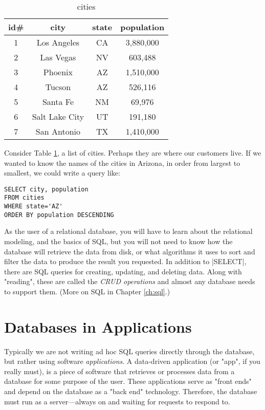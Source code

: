 \documentclass[11pt]{book}
\newcommand{\term}[1]{\emph{#1}} %
\newcommand{\head}[1]{\textnormal{\textbf{#1}}} %
\begin{document}
\begin{table}
\centering
\caption{cities}\label{tab:cities}
\vspace{10pt}
\begin{tabular}{cccc}
    \toprule[1.5pt]
    \head{id\#} & \head{city} & \head{state} & \head{population}\\
    \midrule
    1 & Los Angeles & CA & 3,880,000\\
    2 & Las Vegas & NV & 603,488\\
    3 & Phoenix & AZ & 1,510,000\\
    4 & Tucson & AZ & 526,116\\
    5 & Santa Fe & NM & 69,976\\
    6 & Salt Lake City & UT & 191,180\\
    7 & San Antonio & TX & 1,410,000\\
    \bottomrule[1.5pt]
\end{tabular}
\end{table}

Consider Table \ref{tab:cities}, a list of cities.  Perhaps they are where our customers live.  If we wanted to know the names of the cities in Arizona, in order from largest to smallest, we could write a query like:

\begin{verbatim}
SELECT city, population
FROM cities
WHERE state='AZ'
ORDER BY population DESCENDING
\end{verbatim}

As the user of a relational database, you will have to learn about the relational modeling, and the basics of SQL, but you will not need to know how the database will retrieve the data from disk, or what algorithms it uses to sort and filter the data to produce the result you requested.  In addition to |SELECT|, there are SQL queries for creating, updating, and deleting data.  Along with "reading", these are called the \term{CRUD operations} and almost any database needs to support them.  (More on SQL in Chapter \ref{ch:sql}.)


\section{Databases in Applications}

Typically we are not writing ad hoc SQL queries directly through the database, but rather using software \term{applications}.  A data-driven application (or "app", if you really must), is a piece of software that retrieves or processes data from a database for some purpose of the user.  These applications serve as "front ends" and depend on the database as a "back end" technology.  Therefore, the database must run as a server---always on and waiting for requests to respond to.
\end{document}
